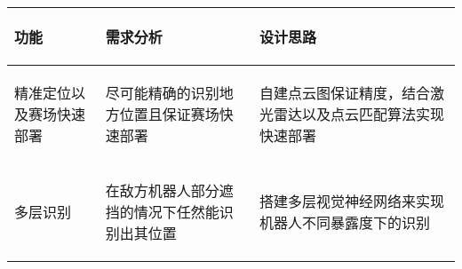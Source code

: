 
\begin{longtable}{ p{2cm} | p{7.8cm} | p{6cm} |}

    \hline

    \endfoot
    
    \rowcolor{tabhdcolor}

        \begin{center}
            功能
        \end{center} &
        \begin{center}
            需求分析
        \end{center} &
        \begin{center}
            设计思路
        \end{center} \\

    \hline

    \endhead

        \begin{center}
            精准定位以及赛场快速部署
        \end{center} &
        \begin{center}
            尽可能精确的识别地方位置且保证赛场快速部署
        \end{center} &
        \begin{center}
            自建点云图保证精度，结合激光雷达以及点云匹配算法实现快速部署
        \end{center} \\
        
    \hline

        \begin{center}
            多层识别
        \end{center} &
        \begin{center}
            在敌方机器人部分遮挡的情况下任然能识别出其位置
        \end{center} &
        \begin{center}
            搭建多层视觉神经网络来实现机器人不同暴露度下的识别
        \end{center} \\
        

\end{longtable}
